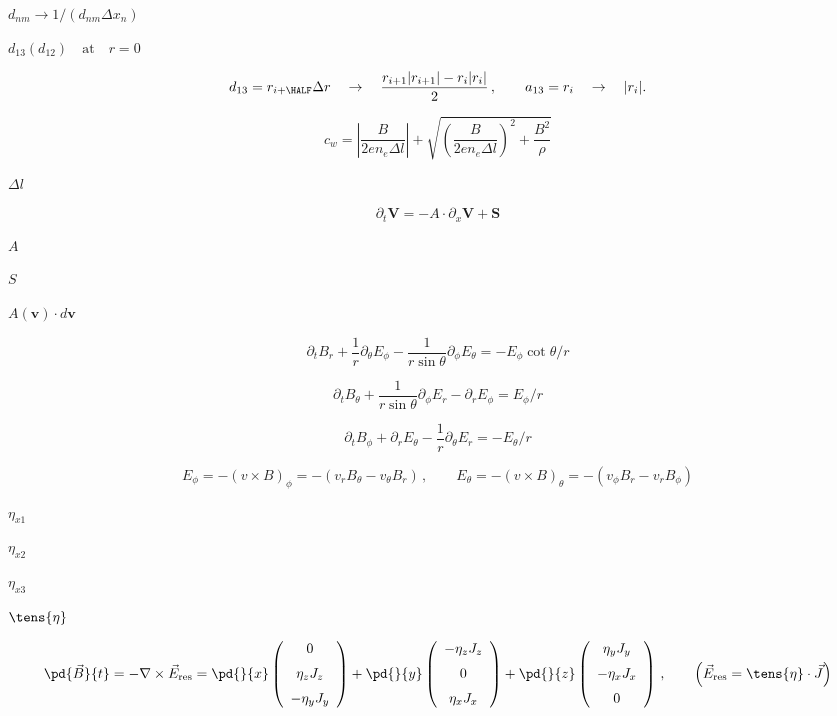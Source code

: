 \documentclass{article}
\begin{document}
$d_{nm} \to 1/(d_{nm}\Delta x_n)$
\pagebreak

$ d_{13} (d_{12})
      \quad\mathrm{at}\quad r=0$
\pagebreak

\[         d_{13} = r_{i+\HALF}\Delta r \quad\to\quad
                  \frac{r_{i+1}|r_{i+1}| - r_i |r_i|}{2}\,,\qquad

         a_{13} = r_i \quad\to\quad  |r_i|.                
\]
\pagebreak

\[  c_w =   \left|\frac{B}{2en_e\Delta l}\right|
        + \sqrt{\left(\frac{B}{2en_e\Delta l}\right)^2 + \frac{B^2}{\rho}}
\]
\pagebreak

$\Delta l$
\pagebreak

\[    \partial_t{\mathbf{V}} = - A\cdot\partial_x\mathbf{V} + \mathbf{S}
\]
\pagebreak

$ A $
\pagebreak

$ S $
\pagebreak

$ A(\mathbf{v})\cdot 
d\mathbf{v} $
\pagebreak

\[ \partial_tB_r + \frac{1}{r}\partial_\theta E_\phi
   - \frac{1}{r\sin\theta}\partial_\phi E_\theta = -E_\phi\cot\theta/r \]
\pagebreak

\[ \partial_t B_\theta + \frac{1}{r\sin\theta}\partial_\phi E_r
   - \partial_rE_\phi =   E_\phi/r \]
\pagebreak

\[ \partial_t B_\phi + \partial_r E_\theta 
   - \frac{1}{r}\partial_\theta E_r = - E_\theta/r\]
\pagebreak

\[ E_\phi   = -(v \times B)_\phi   = - (v_r B_\theta - v_\theta B_r) 
    \,,\qquad
     E_\theta = -(v \times B)_\theta = - (v_\phi B_r    - v_r B_\phi) \]
\pagebreak

$ \eta_{x1}$
\pagebreak

$ \eta_{x2}$
\pagebreak

$ \eta_{x3}$
\pagebreak

$ \tens{\eta}$
\pagebreak

\[   \pd{\vec{B}}{t} = - \nabla\times{\vec{E}_{\rm res}} =
    \pd{}{x}\left(\begin{array}{c}
     0           \\ \noalign{\medskip}
     \eta_z J_z  \\ \noalign{\medskip}
   - \eta_y J_y \end{array}\right)
     +
    \pd{}{y}\left(\begin{array}{c}
   - \eta_z J_z  \\ \noalign{\medskip}
         0       \\ \noalign{\medskip}
     \eta_x J_x \end{array}\right)
      +
    \pd{}{z}\left(\begin{array}{c}
      \eta_y J_y \\ \noalign{\medskip}
     -\eta_x J_x \\ \noalign{\medskip}
          0    \end{array}\right)      
     \,,\qquad
   \left(\vec{E}_{\rm res} = \tens{\eta}\cdot\vec{J}\right)
\]
\pagebreak
\end{document}
